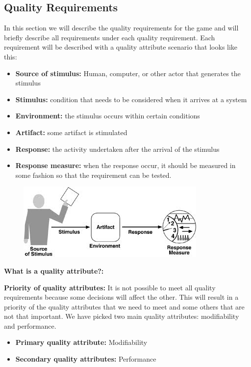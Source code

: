 \subsection{Quality Requirements}

In this section we will describe the quality requirements for the game and
will briefly describe all requirements under each quality requirement.
Each requirement will be described with a quality attribute scenario that looks like this:

\begin{itemize}
	\item {\bf Source of stimulus:} Human, computer, or other actor that generates the stimulus
	\item {\bf Stimulus:} condition that needs to be considered when it arrives at a system
	\item {\bf Environment:} the stimulus occurs within certain conditions
	\item {\bf Artifact:} some artifact is stimulated 
	\item {\bf Response:} the activity undertaken after the arrival of the stimulus
	\item {\bf Response measure:} when the response occur, it should be measured in some fashion so that the requirement can be tested.
\end{itemize}

\begin{figure}[!hr]
	\includegraphics{pictures/qualityAttribute.jpg}
\end{figure}

{\bf What is a quality attribute?:}

{\bf Priority of quality attributes:} It is not possible to meet all quality requirements because some 
decisions will affect the other. This will result in a priority of the quality attributes that we need 
to meet and some others that are not that important. We have picked two main quality attributes: 
modifiability and performance.

\begin{itemize}
	\item {\bf Primary quality attribute: } Modifiability
	\item {\bf Secondary quality attributes: } Performance
\end{itemize}


